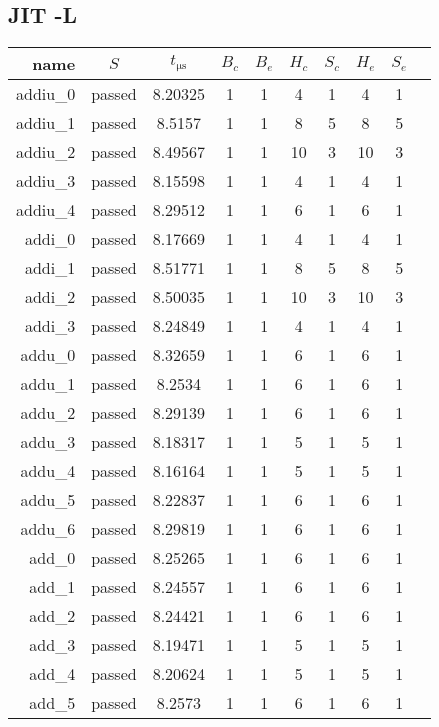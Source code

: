 \subsection{JIT -L}
\begin{longtable}{r|ccccccccc}
    \toprule
    name & $S$ & $t_{\si{\micro\second}}$ & $B_c$ & $B_e$ & $H_c$ & $S_c$ & $H_e$ & $S_e$ \\
    \midrule
    \endhead

    addiu\_0 & passed & 8.20325 & 1 & 1 & 4 & 1 & 4 & 1 \\
    addiu\_1 & passed & 8.5157 & 1 & 1 & 8 & 5 & 8 & 5 \\
    addiu\_2 & passed & 8.49567 & 1 & 1 & 10 & 3 & 10 & 3 \\
    addiu\_3 & passed & 8.15598 & 1 & 1 & 4 & 1 & 4 & 1 \\
    addiu\_4 & passed & 8.29512 & 1 & 1 & 6 & 1 & 6 & 1 \\
    addi\_0 & passed & 8.17669 & 1 & 1 & 4 & 1 & 4 & 1 \\
    addi\_1 & passed & 8.51771 & 1 & 1 & 8 & 5 & 8 & 5 \\
    addi\_2 & passed & 8.50035 & 1 & 1 & 10 & 3 & 10 & 3 \\
    addi\_3 & passed & 8.24849 & 1 & 1 & 4 & 1 & 4 & 1 \\
    addu\_0 & passed & 8.32659 & 1 & 1 & 6 & 1 & 6 & 1 \\
    addu\_1 & passed & 8.2534 & 1 & 1 & 6 & 1 & 6 & 1 \\
    addu\_2 & passed & 8.29139 & 1 & 1 & 6 & 1 & 6 & 1 \\
    addu\_3 & passed & 8.18317 & 1 & 1 & 5 & 1 & 5 & 1 \\
    addu\_4 & passed & 8.16164 & 1 & 1 & 5 & 1 & 5 & 1 \\
    addu\_5 & passed & 8.22837 & 1 & 1 & 6 & 1 & 6 & 1 \\
    addu\_6 & passed & 8.29819 & 1 & 1 & 6 & 1 & 6 & 1 \\
    add\_0 & passed & 8.25265 & 1 & 1 & 6 & 1 & 6 & 1 \\
    add\_1 & passed & 8.24557 & 1 & 1 & 6 & 1 & 6 & 1 \\
    add\_2 & passed & 8.24421 & 1 & 1 & 6 & 1 & 6 & 1 \\
    add\_3 & passed & 8.19471 & 1 & 1 & 5 & 1 & 5 & 1 \\
    add\_4 & passed & 8.20624 & 1 & 1 & 5 & 1 & 5 & 1 \\
    add\_5 & passed & 8.2573 & 1 & 1 & 6 & 1 & 6 & 1 \\

\end{longtable}
